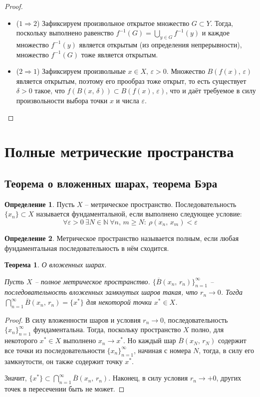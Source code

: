 \documentclass[a4paper,12pt]{article}
\renewcommand{\geq}{\ensuremath{\geqslant}}
\theoremstyle{plain}
\newtheorem{theorem}{Теорема}[section]
\theoremstyle{definition}
\newtheorem{definition}{Определение}[section]
\theoremstyle{remark}
\begin{document}
\begin{proof}
	\begin{itemize}
		\item ($1 \Rightarrow 2$) Зафиксируем произвольное открытое множество $G \subset Y$. Тогда, поскольку выполнено равенство $f^{-1}(G) = \bigcup_{y \in G}f^{-1}(y)$ и каждое множество $f^{-1}(y)$ является открытым (из определения непрерывности), множество $f^{-1}(G)$ тоже является открытым.
		\item ($2 \Rightarrow 1$) Зафиксируем произвольные $x \in X,\, \varepsilon >0$. Множество $B(f(x),\, \varepsilon)$ является открытым, поэтому его прообраз тоже открыт, то есть существует $\delta >0$ такое, что $f(B(x,\, \delta)) \subset B(f(x),\, \varepsilon)$, что и даёт требуемое в силу произвольности выбора точки $x$ и числа $\varepsilon$.
	\end{itemize}
\end{proof}

\section{Полные метрические пространства}
\subsection{Теорема о вложенных шарах, теорема Бэра}
\begin{definition}
	Пусть $X$ -- метрическое пространство. Последовательность $\{x_n\} \subset X$ называется фундаментальной, если выполнено следующее условие:
	\[
		\forall \varepsilon > 0 \: \exists N \in \mathbb{N} \: \forall n,\,m \geq N :\: \rho(x_n,\, x_m) < \varepsilon
	\]
\end{definition}

\begin{definition}
	Метрическое пространство называется полным, если любая фундаментальная последовательность в нём сходится.
\end{definition}

\begin{theorem}
	О вложенных шарах.

	Пусть $X$ -- полное метрическое пространство. $\{\overline{B}(x_n,\, r_n)\}_{n = 1}^\infty$ -- последовательность вложенных замкнутых шаров такая, что $r_n \to 0$. Тогда $\bigcap_{n = 1}^\infty \overline{B}(x_n,\, r_n) = \{x^*\}$ для некоторой точки $x^* \in X$.
\end{theorem}

\begin{proof}
	В силу вложенности шаров и условия $r_n \to 0$, последовательность $\{x_n\}_{n=1}^\infty$ фундаментальна. Тогда, поскольку пространство $X$ полно, для некоторого $x^* \in X$ выполнено $x_n \to x^*$. Но каждый шар $\overline{B}(x_N,\, r_N)$ содержит все точки из последовательности $\{x_n\}_{n = 1}^\infty$, начиная с номера $N$, тогда, в силу его замкнутости, он также содержит точку $x^*$.

	Значит, $\{x^*\} \subset \bigcap_{n = 1}^\infty \overline{B}(x_n,\, r_n)$. Наконец, в силу условия $r_n \to +0$, других точек в пересечении быть не может.
\end{proof}
\end{document}
